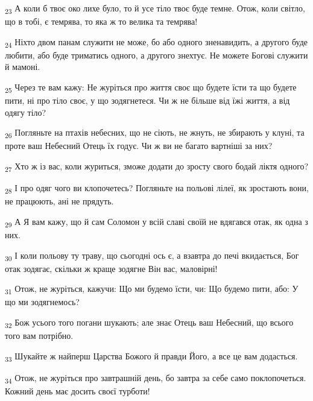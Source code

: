 \begin{tcolorbox}
\textsubscript{23} А коли б твоє око лихе було, то й усе тіло твоє буде темне. Отож, коли світло, що в тобі, є темрява, то яка ж то велика та темрява!
\end{tcolorbox}
\begin{tcolorbox}
\textsubscript{24} Ніхто двом панам служити не може, бо або одного зненавидить, а другого буде любити, або буде триматись одного, а другого знехтує. Не можете Богові служити й мамоні.
\end{tcolorbox}
\begin{tcolorbox}
\textsubscript{25} Через те вам кажу: Не журіться про життя своє що будете їсти та що будете пити, ні про тіло своє, у що зодягнетеся. Чи ж не більше від їжі життя, а від одягу тіло?
\end{tcolorbox}
\begin{tcolorbox}
\textsubscript{26} Погляньте на птахів небесних, що не сіють, не жнуть, не збирають у клуні, та проте ваш Небесний Отець їх годує. Чи ж ви не багато вартніші за них?
\end{tcolorbox}
\begin{tcolorbox}
\textsubscript{27} Хто ж із вас, коли журиться, зможе додати до зросту свого бодай ліктя одного?
\end{tcolorbox}
\begin{tcolorbox}
\textsubscript{28} І про одяг чого ви клопочетесь? Погляньте на польові лілеї, як зростають вони, не працюють, ані не прядуть.
\end{tcolorbox}
\begin{tcolorbox}
\textsubscript{29} А Я вам кажу, що й сам Соломон у всій славі своїй не вдягався отак, як одна з них.
\end{tcolorbox}
\begin{tcolorbox}
\textsubscript{30} І коли польову ту траву, що сьогодні ось є, а взавтра до печі вкидається, Бог отак зодягає, скільки ж краще зодягне Він вас, маловірні!
\end{tcolorbox}
\begin{tcolorbox}
\textsubscript{31} Отож, не журіться, кажучи: Що ми будемо їсти, чи: Що будемо пити, або: У що ми зодягнемось?
\end{tcolorbox}
\begin{tcolorbox}
\textsubscript{32} Бож усього того погани шукають; але знає Отець ваш Небесний, що всього того вам потрібно.
\end{tcolorbox}
\begin{tcolorbox}
\textsubscript{33} Шукайте ж найперш Царства Божого й правди Його, а все це вам додасться.
\end{tcolorbox}
\begin{tcolorbox}
\textsubscript{34} Отож, не журіться про завтрашній день, бо завтра за себе само поклопочеться. Кожний день має досить своєї турботи!
\end{tcolorbox}
